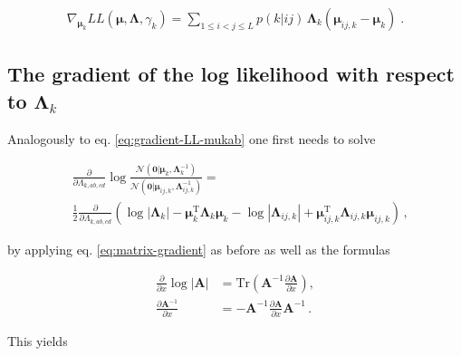 \documentclass[12pt,a4paper,twoside]{book}
\newcommand{\Gauss}{\mathcal{N}}
\newcommand{\Lijk}{\mathbf{\Lambda}_{ij,k}}
\newcommand{\Lk}{\mathbf{\Lambda}_k}
\newcommand{\muijk}{\mathbf{\mu}_{ij,k}}
\newcommand{\muk}{\mathbf{\mu}_k}
\theoremstyle{definition}
\theoremstyle{definition}
\theoremstyle{remark}
\begin{document}
\begin{align}
    \nabla_{\muk} L\!L(\mathbf{\mu}, \mathbf{\Lambda}, \gamma_k)
    =  \sum_{1\le i<j\le L}  p(k|ij)  \,  \Lk \left(  \muijk  - \muk \right) \; .
\label{eq:gradient-muk-final}
\end{align}

\subsection{\texorpdfstring{The gradient of the log likelihood with
respect to
\(\Lk\)}{The gradient of the log likelihood with respect to \textbackslash{}Lk}}\label{the-gradient-of-the-log-likelihood-with-respect-to-lk}

Analogously to eq. \eqref{eq:gradient-LL-mukab} one first needs to solve

\begin{align}
     & \frac{\partial}{\partial \Lambda_{k,ab,cd}} \log \frac{\Gauss( \mathbf{0} | \muk, \Lk^{-1})}{\Gauss( \mathbf{0} | \muijk, \Lijk^{-1})} 
    = \\
    &\frac{1}{2}  \frac{\partial}{\partial \Lambda_{k,ab,cd}}  \left( \log |\Lk| - \muk^\mathrm{T} \Lk \muk - \log |\Lijk| + \muijk^\mathrm{T} \Lijk \muijk \right) \,,
\label{eq:grad-log-N-N-lambdakabcd}
\end{align}

by applying eq. \eqref{eq:matrix-gradient} as before as well as the
formulas

\begin{align}
    \frac{\partial}{\partial x} \log |\mathbf{A} | &= \text{Tr}\left( \mathbf{A}^{-1} \frac{\partial \mathbf{A}}{\partial x}  \right) , \\
    \frac{\partial \mathbf{A}^{-1}}{\partial x} &= - \mathbf{A}^{-1} \frac{\partial \mathbf{A}}{\partial x} \mathbf{A}^{-1} \,.
\end{align}

This yields
\end{document}
